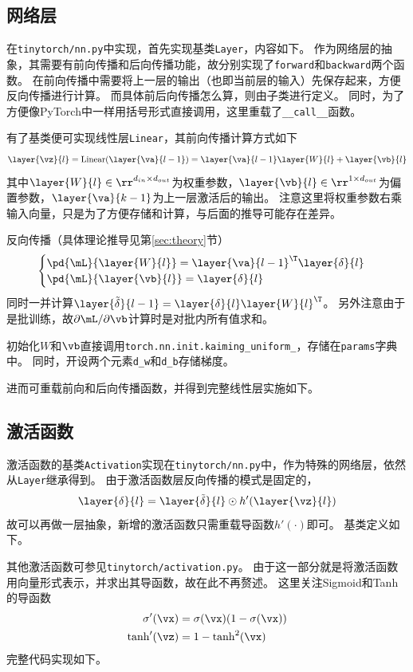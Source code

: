 \documentclass[logo,reportComp]{thesis}
\begin{document}
\subsection{网络层}
在\verb'tinytorch/nn.py'中实现，首先实现基类\verb'Layer'，内容如下。
作为网络层的抽象，其需要有前向传播和后向传播功能，故分别实现了\verb'forward'和\verb'backward'两个函数。
在前向传播中需要将上一层的输出（也即当前层的输入）先保存起来，方便反向传播进行计算。
而具体前后向传播怎么算，则由子类进行定义。
同时，为了方便像PyTorch中一样用括号形式直接调用，这里重载了\verb'__call__'函数。


有了基类便可实现线性层\verb'Linear'，其前向传播计算方式如下
\[\layer{\vz}{l}=\mathrm{Linear}(\layer{\va}{l-1}) = \layer{\va}{l-1} \layer{W}{l} + \layer{\vb}{l}\]
其中$\layer{W}{l}\in\rr^{d_{in}\times d_{out}}$为权重参数，$\layer{\vb}{l}\in\rr^{1\times d_{out}}$为偏置参数，$\layer{\va}{k-1}$为上一层激活后的输出。
注意这里将权重参数右乘输入向量，只是为了方便存储和计算，与后面的推导可能存在差异。

反向传播（具体理论推导见第\ref{sec:theory}节）
\[\begin{cases}
\pd{\mL}{\layer{W}{l}}=\layer{\va}{l-1}^\T\layer{\delta}{l}\\
\pd{\mL}{\layer{\vb}{l}}=\layer{\delta}{l}
\end{cases}\]
同时一并计算$\layer{\tilde{\delta}}{l-1}=\layer{\delta}{l}\layer{W}{l}^\T$。
另外注意由于是批训练，故$\partial\mL/\partial \vb$计算时是对批内所有值求和。

初始化$W$和$\vb$直接调用\verb'torch.nn.init.kaiming_uniform_'，存储在\verb'params'字典中。
同时，开设两个元素\verb'd_w'和\verb'd_b'存储梯度。

进而可重载前向和后向传播函数，并得到完整线性层实施如下。


\subsection{激活函数}
激活函数的基类\verb'Activation'实现在\verb'tinytorch/nn.py'中，作为特殊的网络层，依然从\verb'Layer'继承得到。
由于激活函数层反向传播的模式是固定的，
\[\layer{\delta}{l}=\layer{\tilde{\delta}}{l}\odot h'(\layer{\vz}{l})\]
故可以再做一层抽象，新增的激活函数只需重载导函数$h'(\cdot)$即可。
基类定义如下。


其他激活函数可参见\verb'tinytorch/activation.py'。
由于这一部分就是将激活函数用向量形式表示，并求出其导函数，故在此不再赘述。
这里关注Sigmoid和Tanh的导函数
\[\begin{aligned}
\sigma'(\vx)&=\sigma(\vx)(1-\sigma(\vx))\\
\tanh'(\vz)&=1-\tanh^2(\vx)
\end{aligned}\]
完整代码实现如下。

\end{document}
